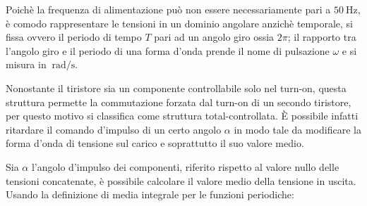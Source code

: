 \documentclass[a4paper,10pt]{article}
\begin{document}
Poichè la frequenza di alimentazione può non essere necessariamente pari a 
$\SI{50}{\hertz}$, è comodo rappresentare le tensioni in un dominio angolare anzichè 
temporale, si fissa ovvero il periodo di tempo \(T\) pari ad un angolo giro ossia 
\(2\pi\); il rapporto tra l'angolo giro e il periodo di una forma d'onda prende il
nome di pulsazione \(\omega\) e si misura in $\SI{}{\radian\per\second}$.
\smallskip

Nonostante il tiristore sia un componente controllabile solo nel turn-on, questa 
struttura permette la commutazione forzata dal turn-on di un secondo tiristore,
per questo motivo si classifica come struttura total-controllata.
È possibile infatti ritardare il comando d'impulso di un certo angolo \(\alpha\) in
modo tale da modificare la forma d'onda di tensione sul carico e soprattutto il suo valore medio.

Sia \(\alpha\) l'angolo d'impulso dei componenti, riferito rispetto al valore nullo
delle tensioni concatenate, è possibile calcolare il valore medio della tensione in uscita.
Usando la definizione di media integrale per le funzioni periodiche:
\end{document}
